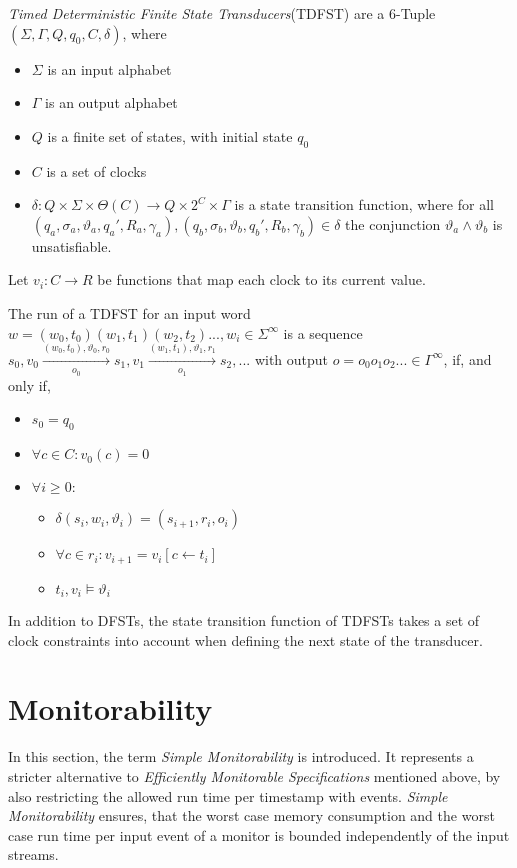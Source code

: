 		\begin{definition}
			\textit{Timed Deterministic Finite State Transducers}(TDFST) are a 6-Tuple $(\Sigma, \Gamma, Q, q_0, C, \delta)$, where
			\begin{itemize}
				\item
				$\Sigma$ is an input alphabet
				\item
				$\Gamma$ is an output alphabet
				\item
				$Q$ is a finite set of states, with initial state $q_0$
				\item
				$C$ is a set of clocks
				\item
				$\delta:Q\times\Sigma\times\Theta(C)\rightarrow Q\times 2^C\times\Gamma$ is a state transition function, where for all $(q_a, \sigma_a, \vartheta_a, q_a', R_a, \gamma_a), (q_b, \sigma_b, \vartheta_b, q_b', R_b, \gamma_b)\in \delta$ the conjunction $\vartheta_a\land\vartheta_b$ is unsatisfiable. 
			\end{itemize}
			Let $v_i:C\rightarrow R$ be functions that map each clock to its current value.
			
			The run of a TDFST for an input word $w=(w_0,t_0)(w_1,t_1)(w_2,t_2)..., w_i\in\Sigma^\infty$ is a sequence $s_0, v_0\xrightarrow[o_0]{(w_0, t_0),\vartheta_0,r_0}s_1,v_1\xrightarrow[o_1]{(w_1, t_1),\vartheta_1,r_1}s_2,...$ with output $o=o_0o_1o_2...\in \Gamma^\infty$, if, and only if, 
			\begin{itemize}
				\item
					$s_0=q_0$
				\item
					$\forall c\in C: v_0(c)=0$
				\item
					$\forall i\geq 0:$
					\begin{itemize}
						\item
							$\delta(s_i, w_i,\vartheta_i)=(s_{i+1},r_i,o_i)$
						\item
							$\forall c\in r_i: v_{i+1}=v_i[c\leftarrow t_i]$
						\item
							$t_i,v_i \models\vartheta_i$
					\end{itemize}
			\end{itemize}
		\end{definition}
		In addition to DFSTs, the state transition function of TDFSTs takes a set of clock constraints into account when defining the next state of the transducer.
	
\section{Monitorability}
	\label{sec:monitorability}
	In this section, the term \textit{Simple Monitorability} is introduced. It represents a stricter alternative to \textit{Efficiently Monitorable Specifications} mentioned above, by also restricting the allowed run time per timestamp with events. \textit{Simple Monitorability} ensures, that the worst case memory consumption and the worst case run time per input event of a monitor is bounded independently of the input streams. 
